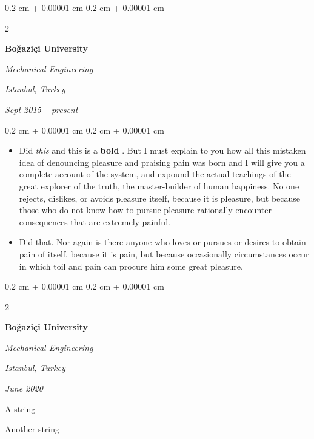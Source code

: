 \documentclass[10pt, letterpaper]{article}
\newenvironment{summary}{
    \begin{description}[
        topsep=0.10 cm,
        parsep=0.10 cm,
        partopsep=0pt,
        itemsep=0pt,
        leftmargin=0.4 cm + 10pt
    ]
}{
    \end{description}
} %
\newenvironment{highlights}{
    \begin{itemize}[
        topsep=0.10 cm,
        parsep=0.10 cm,
        partopsep=0pt,
        itemsep=0pt,
        leftmargin=0.4 cm + 10pt
    ]
}{
    \end{itemize}
} %
\newenvironment{onecolentry}{
    \begin{adjustwidth}{
        0.2 cm + 0.00001 cm
    }{
        0.2 cm + 0.00001 cm
    }
}{
    \end{adjustwidth}
} %
\newenvironment{twocolentry}[2][]{
    \onecolentry
    \def\secondColumn{#2}
    \setcolumnwidth{\fill, 4.5 cm}
    \begin{paracol}{2}
}{
    \switchcolumn \raggedleft \secondColumn
    \end{paracol}
    \endonecolentry
} %
\let\hrefWithoutArrow\href
\renewcommand{\href}[2]{\hrefWithoutArrow{#1}{\ifthenelse{\equal{#2}{}}{ }{#2 }\raisebox{.15ex}{\footnotesize \faExternalLink*}}}
\begin{document}
        \vspace{0.2 cm}

        \begin{twocolentry}{
        \textit{Istanbul, Turkey}    
            
        \textit{Sept 2015 – present}}
            \textbf{Boğaziçi University}

            \textit{Mechanical Engineering}
        \end{twocolentry}
        \vspace{0.10 cm}
        \begin{onecolentry}
            \begin{highlights}
                \item Did \textit{this} and this is a \textbf{bold} \href{https://example.com}{link}. But I must explain to you how all this mistaken idea of denouncing pleasure and praising pain was born and I will give you a complete account of the system, and expound the actual teachings of the great explorer of the truth, the master-builder of human happiness. No one rejects, dislikes, or avoids pleasure itself, because it is pleasure, but because those who do not know how to pursue pleasure rationally encounter consequences that are extremely painful.
                \item Did that. Nor again is there anyone who loves or pursues or desires to obtain pain of itself, because it is pain, but because occasionally circumstances occur in which toil and pain can procure him some great pleasure.
            \end{highlights}
        \end{onecolentry}


        \vspace{0.2 cm}

        \begin{twocolentry}{
        \textit{Istanbul, Turkey}    
            
        \textit{June 2020}}
            \textbf{Boğaziçi University}

            \textit{Mechanical Engineering}
        \end{twocolentry}
            \begin{summary}
                \item A string
                \item Another string
            \end{summary}


        \vspace{0.2 cm}
\end{document}
